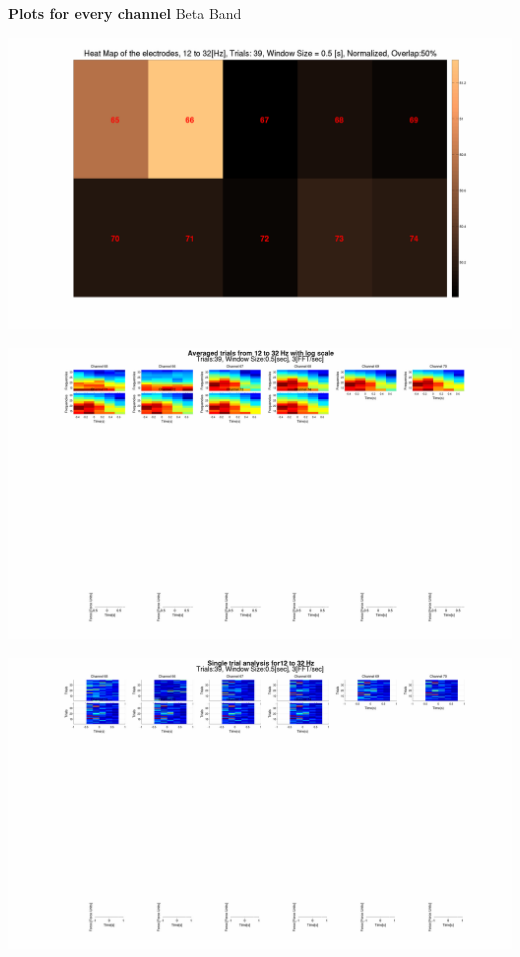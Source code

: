 \documentclass[12pt]{article}
\begin{document}
\begin{center}
\textbf{Plots for every channel}
Beta Band
\end{center}

\includegraphics[scale=0.1]{normalized_analysis_electrode_heatmap12_to_32.png}

\includegraphics[scale=0.1]{log_12_to_32_all_average_channel.png}

\includegraphics[scale=0.1]{log_12_to_32_all_single_trial_channel.png}
\end{document}
